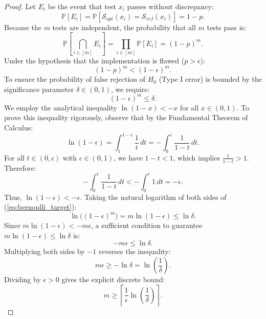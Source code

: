 \documentclass[11pt, letterpaper]{article}
\begin{document}
\begin{proof}
Let $E_i$ be the event that test $x_i$ passes without discrepancy:
\begin{equation}
    \mathbb{P}[E_i] = \mathbb{P}[\mathcal{S}_{opt}(x_i) = \mathcal{S}_{ref}(x_i)] = 1 - p.
\end{equation}
Because the $m$ tests are independent, the probability that all $m$ tests pass is:
\begin{equation}
    \mathbb{P}\left[ \bigcap_{i \in [m]} E_i \right] = \prod_{i \in [m]} \mathbb{P}[E_i] = (1 - p)^m.
\end{equation}
Under the hypothesis that the implementation is flawed ($p > \epsilon$):
\begin{equation}
    (1 - p)^m < (1 - \epsilon)^m.
\end{equation}
To ensure the probability of false rejection of $H_0$ (Type I error) is bounded by the significance parameter $\delta \in (0, 1)$, we require:
\begin{equation}\label{eq:bernoulli_target}
    (1 - \epsilon)^m \le \delta.
\end{equation}
We employ the analytical inequality $\ln(1 - x) < -x$ for all $x \in (0, 1)$. 
To prove this inequality rigorously, observe that by the Fundamental Theorem of Calculus:
\begin{equation}
    \ln(1 - \epsilon) = \int_1^{1-\epsilon} \frac{1}{t} \, dt = -\int_0^\epsilon \frac{1}{1 - t} \, dt.
\end{equation}
For all $t \in (0, \epsilon)$ with $\epsilon \in (0, 1)$, we have $1 - t < 1$, which implies $\frac{1}{1-t} > 1$. Therefore:
\begin{equation}
    -\int_0^\epsilon \frac{1}{1 - t} \, dt < -\int_0^\epsilon 1 \, dt = -\epsilon.
\end{equation}
Thus, $\ln(1 - \epsilon) < -\epsilon$.
Taking the natural logarithm of both sides of (\ref{eq:bernoulli_target}):
\begin{equation}
    \ln\big((1 - \epsilon)^m\big) = m \ln(1 - \epsilon) \le \ln \delta.
\end{equation}
Since $m \ln(1 - \epsilon) < -m \epsilon$, a sufficient condition to guarantee $m \ln(1 - \epsilon) \le \ln \delta$ is:
\begin{equation}
    -m \epsilon \le \ln \delta.
\end{equation}
Multiplying both sides by $-1$ reverses the inequality:
\begin{equation}
    m \epsilon \ge -\ln \delta = \ln\left(\frac{1}{\delta}\right).
\end{equation}
Dividing by $\epsilon > 0$ gives the explicit discrete bound:
\begin{equation}
    m \ge \left\lceil \frac{1}{\epsilon} \ln \left( \frac{1}{\delta} \right) \right\rceil.
\end{equation}
\end{proof}
\end{document}
